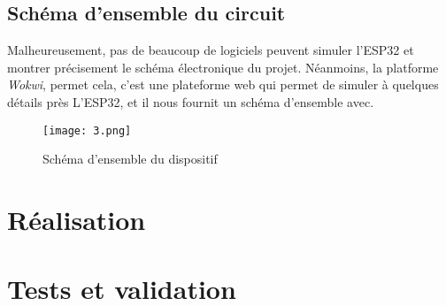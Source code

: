 \section{Schéma d'ensemble du circuit}
Malheureusement, pas de beaucoup de logiciels peuvent simuler l'ESP32 et montrer précisement le schéma électronique du projet. Néanmoins, la platforme \textit{Wokwi}, permet cela, c'est une plateforme web qui permet de simuler à quelques détails près L'ESP32, et il nous fournit un schéma d'ensemble avec.\\[0.3cm]

\begin{figure}[H]
	\centering
	\texttt{[image: 3.png]}
	\caption{Schéma d'ensemble du dispositif}
\end{figure}


\pagestyle{fancy}
\fancyhead{} %
\chapter{Réalisation}













\pagestyle{fancy}
\fancyhead{} %
\chapter{Tests et validation}
